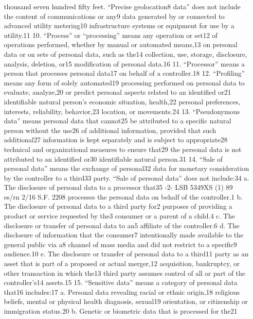 thousand seven hundred fifty feet. “Precise geolocation8
data” does not include the content of communications or any9
data generated by or connected to advanced utility metering10
infrastructure systems or equipment for use by a utility.11
10. “Process” or “processing” means any operation or set12
of operations performed, whether by manual or automated means,13
on personal data or on sets of personal data, such as the14
collection, use, storage, disclosure, analysis, deletion, or15
modification of personal data.16
11. “Processor” means a person that processes personal data17
on behalf of a controller.18
12. “Profiling” means any form of solely automated19
processing performed on personal data to evaluate, analyze,20
or predict personal aspects related to an identified or21
identifiable natural person’s economic situation, health,22
personal preferences, interests, reliability, behavior,23
location, or movements.24
13. “Pseudonymous data” means personal data that cannot25
be attributed to a specific natural person without the use26
of additional information, provided that such additional27
information is kept separately and is subject to appropriate28
technical and organizational measures to ensure that29
the personal data is not attributed to an identified or30
identifiable natural person.31
14. “Sale of personal data” means the exchange of personal32
data for monetary consideration by the controller to a third33
party. “Sale of personal data” does not include:34
a. The disclosure of personal data to a processor that35
-2-
LSB 5349XS (1) 89
es/rn 2/16
S.F. 2208
processes the personal data on behalf of the controller.1
b. The disclosure of personal data to a third party for2
purposes of providing a product or service requested by the3
consumer or a parent of a child.4
c. The disclosure or transfer of personal data to an5
affiliate of the controller.6
d. The disclosure of information that the consumer7
intentionally made available to the general public via a8
channel of mass media and did not restrict to a specific9
audience.10
e. The disclosure or transfer of personal data to a third11
party as an asset that is part of a proposed or actual merger,12
acquisition, bankruptcy, or other transaction in which the13
third party assumes control of all or part of the controller's14
assets.15
15. “Sensitive data” means a category of personal data that16
includes:17
a. Personal data revealing racial or ethnic origin,18
religious beliefs, mental or physical health diagnosis, sexual19
orientation, or citizenship or immigration status.20
b. Genetic or biometric data that is processed for the21
